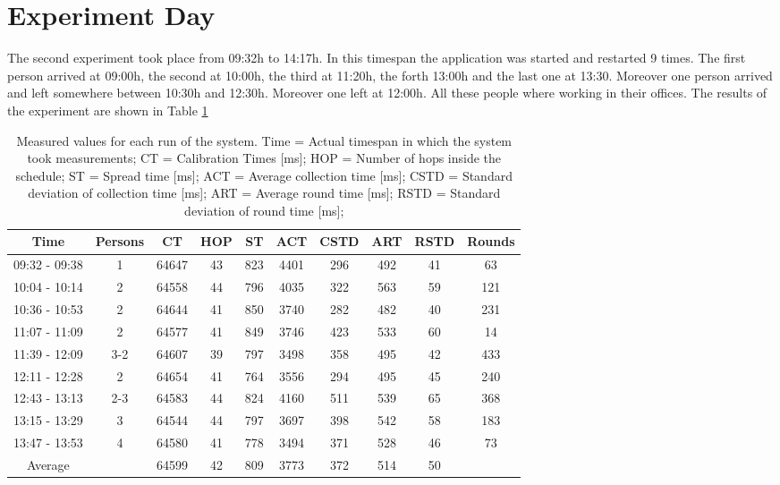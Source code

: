 \section{Experiment Day}
The second experiment took place from 09:32h to 14:17h. In this timespan the application was started and restarted 9 times. The first person arrived at 09:00h, the second at 10:00h, the third at 11:20h, the forth 13:00h and the last one at 13:30. Moreover one person arrived and left somewhere between 10:30h and 12:30h. Moreover one left at 12:00h. All these people where working in their offices.
The results of the experiment are shown in Table \ref{tab:DayTable}
\begin{table}[htbp]
 \caption{Measured values for each run of the system. Time = Actual timespan in which the system took measurements; CT = Calibration Times [ms]; HOP = Number of hops inside the schedule; ST = Spread time [ms]; ACT = Average collection time [ms]; CSTD = Standard deviation of collection time [ms]; ART = Average round time [ms]; RSTD = Standard deviation of round time [ms];}
 \centering
 \begin{tabular}{c|c||c|c|c|c|c|c|c|c}
  Time & Persons & CT & HOP & ST & ACT & CSTD & ART & RSTD & Rounds\\ \toprule
  09:32 - 09:38 & 1 & 64647 & 43 & 823 & 4401 & 296 & 492 & 41 & 63\\ 
  10:04 - 10:14 & 2 & 64558 & 44 & 796 & 4035 & 322 & 563 & 59 & 121\\
  10:36 - 10:53 & 2 & 64644 & 41 & 850 & 3740 & 282 & 482 & 40 & 231\\
  11:07 - 11:09 & 2 & 64577 & 41 & 849 & 3746 & 423 & 533 & 60 & 14\\ 
  11:39 - 12:09 & 3-2 & 64607 & 39 & 797 & 3498 & 358 & 495 & 42 & 433\\
  12:11 - 12:28 & 2 & 64654 & 41 & 764 & 3556 & 294 & 495 & 45 & 240\\
  12:43 - 13:13 & 2-3 & 64583 & 44 & 824 & 4160 & 511 & 539 & 65 & 368\\
  13:15 - 13:29 & 3 & 64544 & 44 & 797 & 3697 & 398 & 542 & 58 & 183\\
  13:47 - 13:53 & 4 & 64580 & 41 & 778 & 3494 & 371 & 528 & 46 & 73\\ \toprule
  Average & & 64599 & 42 & 809 & 3773 & 372 & 514 & 50 & \\
 \end{tabular}
 \label{tab:DayTable}
\end{table}

